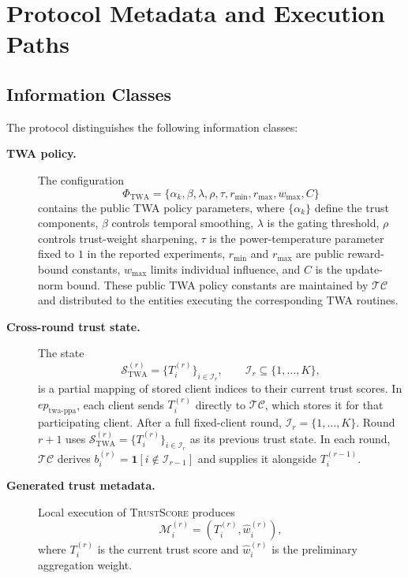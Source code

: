 \documentclass{article}
\begin{document}
\section{Protocol Metadata and Execution Paths}\label{sec:supp_protocol_metadata}

\subsection{Information Classes}\label{sec:supp_information_classes}

The protocol distinguishes the following information classes:

\begin{description}

  \item[\textbf{TWA policy.}]
  The configuration
  \[
  \Phi_{\mathrm{TWA}}
  =
  \{\alpha_k,\beta,\lambda,\rho,\tau,r_{\min},r_{\max},w_{\max},C\}
  \]
  contains the public TWA policy parameters, where $\{\alpha_k\}$ define the
  trust components, $\beta$ controls temporal
  smoothing, $\lambda$ is the gating threshold, $\rho$ controls trust-weight
  sharpening, $\tau$ is the power-temperature parameter fixed to $1$ in
  the reported experiments, $r_{\min}$ and $r_{\max}$ are public reward-bound
  constants, $w_{\max}$ limits individual influence, and $C$ is the update-norm
  bound. These public TWA policy constants are maintained by $\mathcal{TC}$ and
  distributed to the entities executing the corresponding TWA routines.

  \item[\textbf{Cross-round trust state.}]
  The state
  \[
  \mathcal{S}_{\mathrm{TWA}}^{(r)}
  =
  \{T_i^{(r)}\}_{i\in\mathcal I_r},
  \qquad \mathcal I_r\subseteq\{1,\ldots,K\},
  \]
  is a partial mapping of stored client indices to their current trust
  scores. In
  $ep_{\mathrm{twa\text{-}ppa}}$, each client sends $T_i^{(r)}$ directly
  to $\mathcal{TC}$, which stores it for that participating client. After a
  full fixed-client round, $\mathcal I_r=\{1,\ldots,K\}$. Round $r+1$ uses
  $\mathcal{S}_{\mathrm{TWA}}^{(r)}
  =
  \{T_i^{(r)}\}_{i\in\mathcal I_r}$
  as its previous trust state. In each round, $\mathcal{TC}$ derives
  $b_i^{(r)}=\mathbf1[i\notin\mathcal I_{r-1}]$ and supplies it alongside
  $T_i^{(r-1)}$.

  \item[\textbf{Generated trust metadata.}]
  Local execution of \textsc{TrustScore} produces
  \[
  \mathcal{M}_i^{(r)}
  =
  \left(
  T_i^{(r)},
  \hat{w}_i^{(r)}
  \right),
  \]
  where $T_i^{(r)}$ is the current trust score and
  $\hat{w}_i^{(r)}$ is the preliminary aggregation weight.


\end{description}
\end{document}
